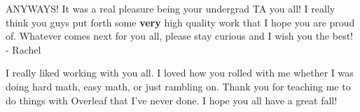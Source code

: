 \documentclass[11pt]{article}
\begin{document}
\begin{enumerate}[leftmargin=*]
\begin{solution}
         ANYWAYS! It was a real pleasure being your undergrad TA you all! I really think you guys put forth some \textbf {very} high quality work that I hope you are proud of. Whatever comes next for you all, please stay curious and I wish you the best! - Rachel \color{black}

         \color{djs} I really liked working with you all. I loved how you rolled with me whether I was doing hard math, easy math, or just rambling on. Thank you for teaching me to do things with Overleaf that I've never done. I hope you all have a great fall!\color{black}
        
    \end{solution}
\end{enumerate}
\end{document}
